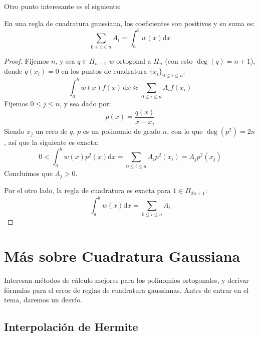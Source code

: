   Otro punto interesante es el siguiente:
  \begin{lemma}
    \label{lem:cuadratura-gaussiana-suma-coeficientes}
    En una regla de cuadratura gaussiana,
    los coeficientes son positivos
    y su suma es:
    \begin{equation*}
      \sum_{0 \le i \le n} A_i
        = \int_a^b w(x) \mathrm{d} x
    \end{equation*}
  \end{lemma}
  \begin{proof}
    Fijemos \(n\),
    y sea \(q \in \Pi_{n + 1}\) \(w\)\nobreakdash-ortogonal a \(\Pi_n\)
    (con esto \(\deg(q) = n + 1\)),
    donde \(q(x_i) = 0\)
    en los puntos de cuadratura \(\{ x_i \}_{0 \le i \le n}\):
    \begin{equation*}
      \int_a^b w(x) f(x) \, \mathrm{d} x
        \approx \sum_{0 \le i \le n} A_i f(x_i)
    \end{equation*}
    Fijemos \(0 \le j \le n\),
    y sea dado por:
    \begin{equation*}
      p(x)
        = \frac{q(x)}{x - x_j}
    \end{equation*}
    Siendo \(x_j\) un cero de \(q\),
    \(p\) es un polinomio de grado \(n\),
    con lo que \(\deg(p^2) = 2 n\),
    así que la siguiente es exacta:
    \begin{equation*}
      0
        < \int_a^b w(x) p^2(x) \mathrm{d} x
        = \sum_{0 \le i \le n} A_i p^2(x_i)
        = A_j p^2(x_j)
    \end{equation*}
    Concluimos que \(A_j > 0\).

    Por el otro lado,
    la regla de cuadratura es exacta para \(1 \in \Pi_{2 n + 1}\):
    \begin{equation*}
      \int_a^b w(x) \mathrm{d} x
        = \sum_{0 \le i \le n} A_i
    \end{equation*}
  \end{proof}

\section{Más sobre Cuadratura Gaussiana}
\label{sec:mas-cuadratura-gauss}

  Interesan métodos de cálculo mejores para los polinomios ortogonales,
  y derivar fórmulas para el error de reglas de cuadratura gaussianas.
  Antes de entrar en el tema,
  daremos un desvío.

\subsection{Interpolación de Hermite}
\label{sec:interpolacion-Hermite}

